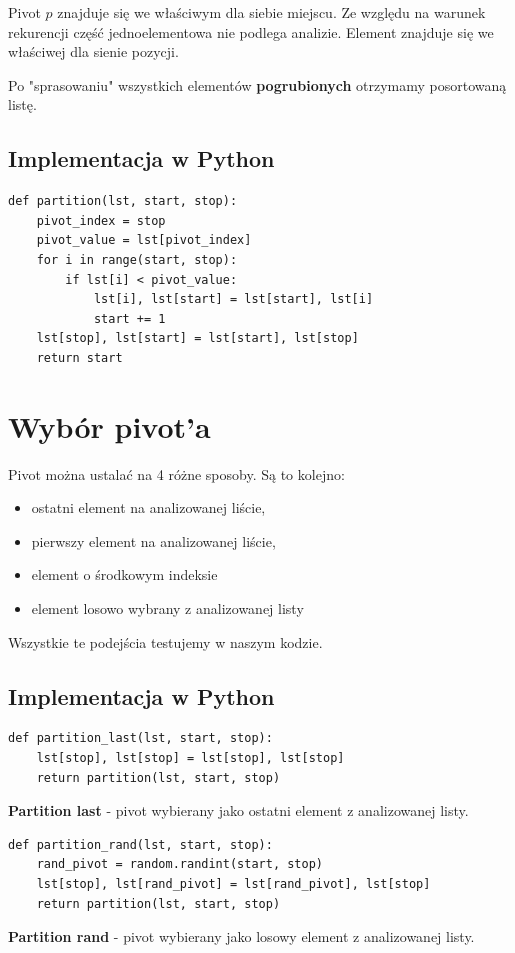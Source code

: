 \documentclass[a4paper,11pt]{report}
\begin{document}
Pivot $p$ znajduje się we właściwym dla siebie miejscu. Ze względu na warunek rekurencji część jednoelementowa nie podlega analizie. Element znajduje się we właściwej dla sienie pozycji.


Po "sprasowaniu" wszystkich elementów \textbf{pogrubionych} otrzymamy posortowaną listę.

\subsection{Implementacja w Python}

\begin{Verbatim}
def partition(lst, start, stop):
    pivot_index = stop
    pivot_value = lst[pivot_index]
    for i in range(start, stop):
        if lst[i] < pivot_value:
            lst[i], lst[start] = lst[start], lst[i]
            start += 1
    lst[stop], lst[start] = lst[start], lst[stop]
    return start
\end{Verbatim}


\section{Wybór pivot'a}
Pivot można ustalać na 4 różne sposoby. Są to kolejno:
\begin{itemize}
\item ostatni element na analizowanej liście,
\item pierwszy element na analizowanej liście, 
\item element o środkowym indeksie
\item element losowo wybrany z analizowanej listy
\end{itemize} 
Wszystkie te podejścia testujemy w naszym kodzie.

\subsection{Implementacja w Python}

\begin{verbatim}
def partition_last(lst, start, stop):
    lst[stop], lst[stop] = lst[stop], lst[stop]
    return partition(lst, start, stop)
\end{verbatim}
\textbf{Partition last} - pivot wybierany jako ostatni element z analizowanej listy.

\begin{verbatim}
def partition_rand(lst, start, stop):
    rand_pivot = random.randint(start, stop)
    lst[stop], lst[rand_pivot] = lst[rand_pivot], lst[stop]
    return partition(lst, start, stop)
\end{verbatim}
\textbf{Partition rand} - pivot wybierany jako losowy element z analizowanej listy.
\end{document}

